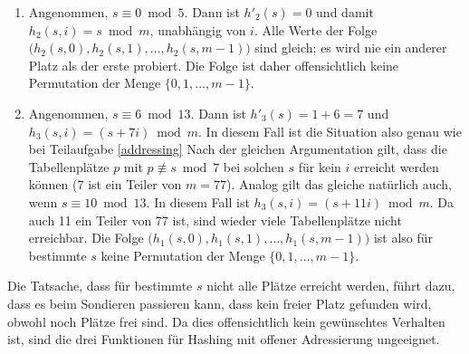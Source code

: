 \documentclass[11pt,a4paper]{article}
\begin{document}
\begin{loesung}
\begin{enumerate}
\begin{enumerate}[label=\roman*)]
            \item Angenommen, $s \equiv 0 \bmod 5$.
            Dann ist $h'_2(s) = 0$ und damit $h_2(s, i) = s \bmod m$, unabhängig von $i$.
            Alle Werte der Folge $\big(h_2(s, 0), h_2(s, 1), \ldots, h_2(s, m - 1)\big)$ sind gleich; es wird nie ein anderer Platz als der erste probiert.
            Die Folge ist daher offensichtlich keine Permutation der Menge $\{0, 1, \ldots, m - 1\}$.
            
            \item Angenommen, $s \equiv 6 \bmod 13$.
            Dann ist $h'_3(s) = 1 + 6 = 7$ und $h_3(s, i) = (s + 7i) \bmod m$.
            In diesem Fall ist die Situation also genau wie bei Teilaufgabe \ref*{addressing}
            Nach der gleichen Argumentation gilt, dass die Tabellenplätze $p$ mit $p \not\equiv s \bmod 7$ bei solchen $s$ für kein $i$ erreicht werden können (7 ist ein Teiler von $m = 77$).
            Analog gilt das gleiche natürlich auch, wenn $s \equiv 10 \bmod 13$.
            In diesem Fall ist $h_3(s, i) = (s + 11i) \bmod m$.
            Da auch 11 ein Teiler von 77 ist, sind wieder viele Tabellenplätze nicht erreichbar.
            Die Folge $\big(h_1(s, 0), h_1(s, 1), \ldots, h_1(s, m - 1)\big)$ ist also für bestimmte $s$ keine Permutation der Menge $\{0, 1, \ldots, m - 1\}$.
        \end{enumerate}
        Die Tatsache, dass für bestimmte $s$ nicht alle Plätze erreicht werden, führt dazu, dass es beim Sondieren passieren kann, dass kein freier Platz gefunden wird, obwohl noch Plätze frei sind.
        Da dies offensichtlich kein gewünschtes Verhalten ist, sind die drei Funktionen für Hashing mit offener Adressierung ungeeignet.
    \end{enumerate}
\end{loesung}
\end{document}
